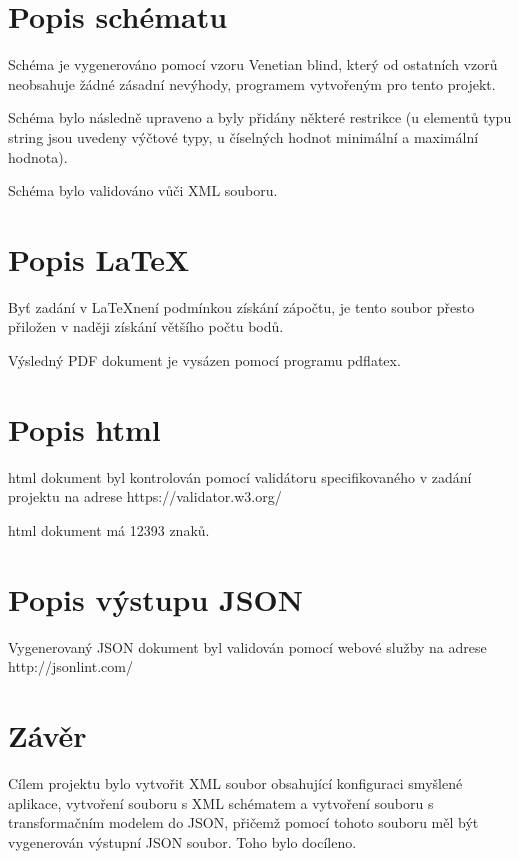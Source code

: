 \documentclass[czech]{article}
\begin{document}
\section{Popis schématu}

Schéma je vygenerováno pomocí vzoru \textquotedbl{}Venetian blind\textquotedbl{},
který od ostatních vzorů neobsahuje žádné zásadní nevýhody, programem
vytvořeným pro tento projekt.

Schéma bylo následně upraveno a byly přidány některé restrikce (u
elementů typu string jsou uvedeny výčtové typy, u číselných hodnot
minimální a maximální hodnota).

Schéma bylo validováno vůči XML souboru.


\section{Popis \LaTeX}

Byť zadání v \LaTeX není podmínkou získání zápočtu, je tento soubor
přesto přiložen v naději získání většího počtu bodů.

Výsledný PDF dokument je vysázen pomocí programu pdflatex.


\section{Popis html}

html dokument byl kontrolován pomocí validátoru specifikovaného v
zadání projektu na adrese https://validator.w3.org/

html dokument má 12393 znaků.


\section{Popis výstupu JSON}

Vygenerovaný JSON dokument byl validován pomocí webové služby na adrese
http://jsonlint.com/


\section{Závěr}

Cílem projektu bylo vytvořit XML soubor obsahující konfiguraci smyšlené
aplikace, vytvoření souboru s XML schématem a vytvoření souboru s
transformačním modelem do JSON, přičemž pomocí tohoto souboru měl
být vygenerován výstupní JSON soubor. Toho bylo docíleno.
\end{document}
